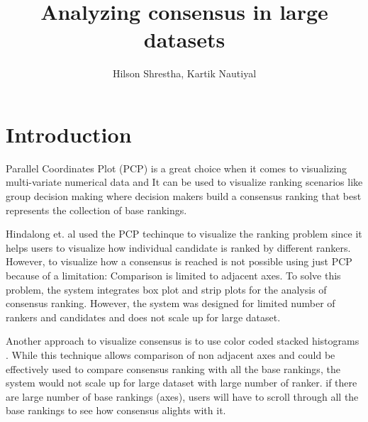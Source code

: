 \documentclass{proc}
\begin{document}
\title{Analyzing consensus in large datasets}

\author{Hilson Shrestha, Kartik Nautiyal}

\maketitle


\section{Introduction}



Parallel Coordinates Plot (PCP) is a great choice when it comes to visualizing multi-variate numerical data and It can be used to visualize ranking scenarios like group decision making where decision makers build a consensus ranking that best represents the collection of base rankings.

Hindalong et. al \cite{hindalong2020towards} used the PCP techinque to visualize the ranking problem since it helps users to visualize how individual candidate is ranked by different rankers. However, to visualize how a consensus is reached is not possible using just PCP because of a limitation: Comparison is limited to adjacent axes. To solve this problem, the system integrates box plot and strip plots for the analysis of consensus ranking. However, the system was designed for limited number of rankers and candidates and does not scale up for large dataset.

Another approach to visualize consensus is to use color coded stacked histograms \cite{bok2020augmenting}. While this technique allows comparison of non adjacent axes and could be effectively used to compare consensus ranking with all the base rankings, the system would not scale up for large dataset with large number of ranker. if there are large number of base rankings (axes), users will have to scroll through all the base rankings to see how consensus alights with it.
\end{document}
